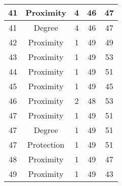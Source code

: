 \documentclass[results.tex]{subfiles}
\begin{document}
\begin{center}
\begin{tabular}{| c || c | c | c | c |}
            \hline
            41                      & Proximity                    & 4                      & 46                      & 47                   \\
            \hline
            41                      & Degree                       & 4                      & 46                      & 47                   \\
            \hline
            42                      & Proximity                    & 1                      & 49                      & 49                   \\
            \hline
            43                      & Proximity                    & 1                      & 49                      & 53                   \\
            \hline
            44                      & Proximity                    & 1                      & 49                      & 51                   \\
            \hline
            45                      & Proximity                    & 1                      & 49                      & 45                   \\
            \hline
            46                      & Proximity                    & 2                      & 48                      & 53                   \\
            \hline
            47                      & Proximity                    & 1                      & 49                      & 51                   \\
            \hline
            47                      & Degree                       & 1                      & 49                      & 51                   \\
            \hline
            47                      & Protection                   & 1                      & 49                      & 51                   \\
            \hline
            48                      & Proximity                    & 1                      & 49                      & 47                   \\
            \hline
            49                      & Proximity                    & 1                      & 49                      & 43                   \\
            \hline
        \end{tabular}
    \end{center}
\end{document}
